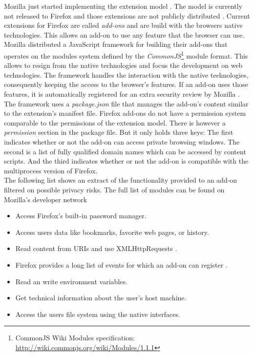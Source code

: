 	Mozilla just started implementing the extension model \cite{mozillaBlogWebExtension}. The model is currently not released to Firefox and those extensions are not publicly distributed \cite{mozillaWebExtensionStatus}. Current extensions for Firefox are called \textit{add-ons} and are build with the browsers native technologies. This allows an add-on to use any feature that the browser can use. Mozilla distributed a JavaScript framework for building their add-ons that operates on the modules system defined by the \textit{CommonJS}\footnote{CommonJS Wiki Modules specification: \url{http://wiki.commonjs.org/wiki/Modules/1.1.1}} module format. This allows to resign from the native technologies and focus the development on web technologies. The framework handles the interaction with the native technologies, consequently keeping the access to the browser's features. If an add-on uses those features, it is automatically registered for an extra security review by Mozilla \cite{mozillaDevChromeAuthority}. \\
	The framework uses a \textit{package.json} file that manages the add-on's content similar to the extension's manifest file. Firefox add-ons do not have a permission system comparable to the permissions of the extension model. There is however a \textit{permission} section in the package file. But it only holds three keys: The first indicates whether or not the add-on can access private browsing windows. The second is a list of fully qualified domain names which can be accessed by content scripts. And the third indicates whether or not the add-on is compatible with the multiprocess version of Firefox. \\
	
	The following list shows an extract of the functionality provided to an add-on filtered on possible privacy risks. The full list of modules can be found on Mozilla's developer network \cite{mozillaDevHighLevelApiList, mozillaDevLowLevelApiList} 
	\begin{itemize}
		\item Access Firefox's built-in password manager.
		\item Access users data like bookmarks, favorite web pages, or history.
		\item Read content from URIs and use XMLHttpRequests \cite{w3cXMLHttpRequest}.
		\item Firefox provides a long list of events for which an add-on can register \cite{mozillaDevSystemEvents}.
		\item Read an write environment variables.
		\item Get technical information about the user's host machine.
		\item Access the users file system using the native interfaces.
	\end{itemize}
	
